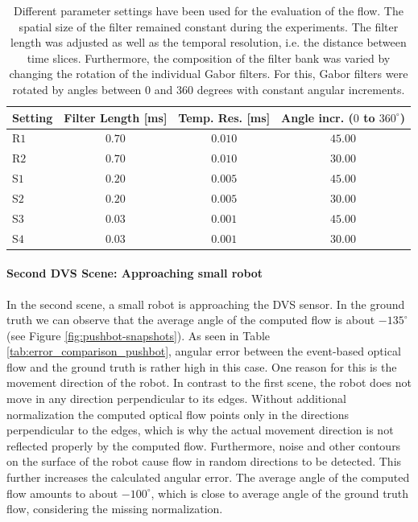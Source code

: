 \begin{table}[tb]
	\centering
		\begin{tabular}{lccc}
Setting & Filter Length [ms] & Temp. Res. [ms] & Angle incr. ($0$ to $360^\circ$) \\
\hline  \hline
R$1$ & $0.70$ & $0.010$ & $45.00$\\
R$2$ & $0.70$ & $0.010$ & $30.00$\\
S$1$ & $0.20$ & $0.005$ & $45.00$\\
S$2$ & $0.20$ & $0.005$ & $30.00$\\
S$3$ & $0.03$ & $0.001$ & $45.00$\\
S$4$ & $0.03$ & $0.001$ & $30.00$\\
		\end{tabular}
	\caption[Different parameter settings for the evaluations]{Different parameter settings have been used for the evaluation of the flow.
	 The spatial size of the filter remained constant during the experiments.
	 The filter length was adjusted as well as the temporal resolution, i.e. the distance between time slices. 
	 Furthermore, the composition of the filter bank was varied by changing the rotation of the individual Gabor filters. 
	 For this, Gabor filters were rotated by angles between $0$ and $360$ degrees with constant angular increments.}
	\label{tab:parameter_settings}
\end{table}

\paragraph{Second DVS Scene: Approaching small robot}

In the second scene, a small robot is approaching the DVS sensor.
In the ground truth we can observe that the average angle of the computed flow is about $-135^\circ$ (see Figure \ref{fig:pushbot-snapshots}). 
As seen in Table \ref{tab:error_comparison_pushbot}, angular error between the event-based optical flow and the ground truth is rather high in this case.
One reason for this is the movement direction of the robot.
In contrast to the first scene, the robot does not move in any direction perpendicular to its edges.
Without additional normalization the computed optical flow points only in the directions perpendicular to the edges, which is why the actual movement direction is not reflected properly by the computed flow.
Furthermore, noise and other contours on the surface of the robot cause flow in random directions to be detected.
This further increases the calculated angular error.
The average angle of the computed flow amounts to about $-100^\circ$, which is close to average angle of the ground truth flow, considering the missing normalization.


